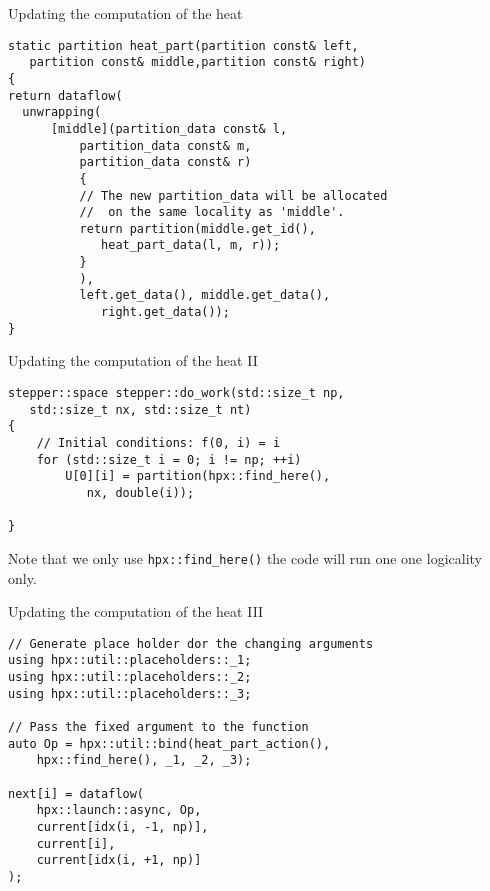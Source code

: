 \documentclass[\classoption]{beamer}
\begin{document}
\begin{frame}[fragile]{Updating the computation of the heat}

\begin{lstlisting}
static partition heat_part(partition const& left, 
   partition const& middle,partition const& right)
{
return dataflow(
  unwrapping(
      [middle](partition_data const& l, 
          partition_data const& m,
          partition_data const& r)
          {
          // The new partition_data will be allocated
          //  on the same locality as 'middle'.
          return partition(middle.get_id(), 
             heat_part_data(l, m, r));
          }
          ),
          left.get_data(), middle.get_data(), 
             right.get_data());
}
\end{lstlisting}

\end{frame}

\begin{frame}[fragile]{Updating the computation of the heat II}

\begin{lstlisting}
stepper::space stepper::do_work(std::size_t np, 
   std::size_t nx, std::size_t nt)
{
    // Initial conditions: f(0, i) = i
    for (std::size_t i = 0; i != np; ++i)
        U[0][i] = partition(hpx::find_here(), 
           nx, double(i));

}
\end{lstlisting}
\vspace{0.25cm}
Note that we only use \lstinline|hpx::find_here()| the code will run one one logicality only.
\end{frame}

\begin{frame}[fragile]{Updating the computation of the heat III}

\begin{lstlisting}
// Generate place holder dor the changing arguments
using hpx::util::placeholders::_1;
using hpx::util::placeholders::_2;
using hpx::util::placeholders::_3;

// Pass the fixed argument to the function
auto Op = hpx::util::bind(heat_part_action(), 
    hpx::find_here(), _1, _2, _3);
    
next[i] = dataflow(
    hpx::launch::async, Op,
    current[idx(i, -1, np)], 
    current[i], 
    current[idx(i, +1, np)]
);
\end{lstlisting}

\end{frame}
\end{document}

